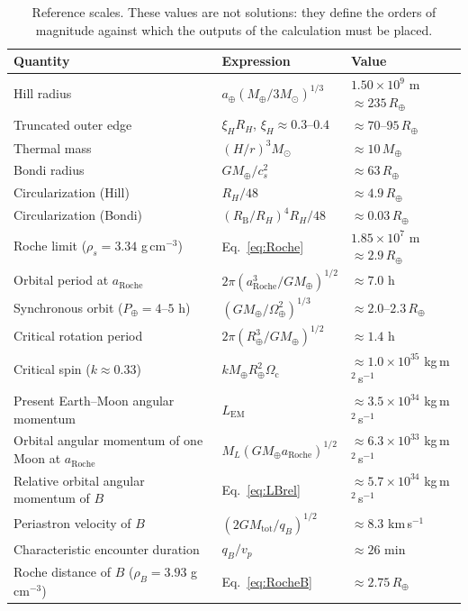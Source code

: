 \documentclass[11pt,a4paper,openany]{report}
\newcommand{\Mt}{M_{\oplus}}
\newcommand{\Rt}{R_{\oplus}}
\newcommand{\aR}{a_{\mathrm{Roche}}}
\newcommand{\Mtot}{M_{\mathrm{tot}}}
\begin{document}
\begin{table}[htbp]
\centering
\small
\caption{Reference scales. These values are not solutions: they define the orders of magnitude
against which the outputs of the calculation must be placed.}
\label{tab:echelles}
\begin{tabular}{lll}
\toprule
\textbf{Quantity} & \textbf{Expression} & \textbf{Value} \\
\midrule
Hill radius & $a_\oplus(\Mt/3M_\odot)^{1/3}$ & $1.50\times10^{9}$ m $\approx235\,\Rt$ \\
Truncated outer edge & $\xi_H R_H$, $\xi_H\approx0.3$--$0.4$ & $\approx70$--$95\,\Rt$ \\
Thermal mass & $(H/r)^3M_\odot$ & $\approx10\,\Mt$ \\
Bondi radius & $G\Mt/c_s^2$ & $\approx63\,\Rt$ \\
Circularization (Hill) & $R_H/48$ & $\approx4.9\,\Rt$ \\
Circularization (Bondi) & $(R_{\mathrm{B}}/R_H)^4R_H/48$ & $\approx0.03\,\Rt$ \\
Roche limit ($\rho_s=3.34$ g\,cm$^{-3}$) & Eq.~\eqref{eq:Roche} & $1.85\times10^{7}$ m $\approx2.9\,\Rt$ \\
Orbital period at $\aR$ & $2\pi(\aR^3/G\Mt)^{1/2}$ & $\approx7.0$ h \\
Synchronous orbit ($P_\oplus=4$--$5$ h) & $(G\Mt/\Omega_\oplus^2)^{1/3}$ & $\approx2.0$--$2.3\,\Rt$ \\
Critical rotation period & $2\pi(\Rt^3/G\Mt)^{1/2}$ & $\approx1.4$ h \\
Critical spin ($k\approx0.33$) & $k\Mt\Rt^2\Omega_{\mathrm{c}}$ & $\approx1.0\times10^{35}$ kg\,m$^2$\,s$^{-1}$ \\
Present Earth--Moon angular momentum & $L_{\mathrm{EM}}$ & $\approx3.5\times10^{34}$ kg\,m$^2$\,s$^{-1}$ \\
Orbital angular momentum of one Moon at $\aR$ & $M_L(G\Mt\aR)^{1/2}$ & $\approx6.3\times10^{33}$ kg\,m$^2$\,s$^{-1}$ \\
Relative orbital angular momentum of $B$ & Eq.~\eqref{eq:LBrel} & $\approx5.7\times10^{34}$ kg\,m$^2$\,s$^{-1}$ \\
Periastron velocity of $B$ & $(2G\Mtot/q_B)^{1/2}$ & $\approx8.3$ km\,s$^{-1}$ \\
Characteristic encounter duration & $q_B/v_p$ & $\approx26$ min \\
Roche distance of $B$ ($\rho_B=3.93$ g\,cm$^{-3}$) & Eq.~\eqref{eq:RocheB} & $\approx2.75\,\Rt$ \\
\bottomrule
\end{tabular}
\end{table}
\end{document}
